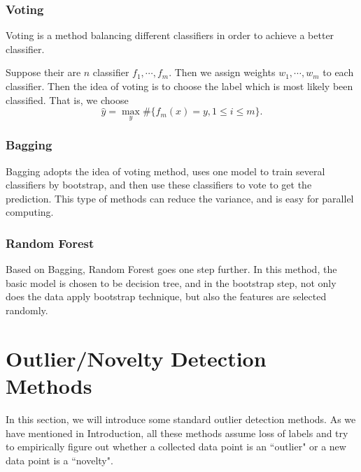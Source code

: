 \documentclass[english]{article}
\begin{document}
\subsubsection{Voting}
\par Voting is a method balancing different classifiers in order to achieve a better classifier.
\par Suppose their are $n$ classifier $f_{1}, \cdots, f_{m}$. Then we assign weights $w_{1}, \cdots, w_{m}$ to each classifier. Then the idea of voting is to choose the label which is most likely been classified. That is, we choose 
\begin{equation}
	\hat{y} = \max_{y}\#\{f_{m}(x) = y, 1\le i\le m\}.
\end{equation}

\subsubsection{Bagging}
\par Bagging adopts the idea of voting method, uses one model to train several classifiers by bootstrap, and then use these classifiers to vote to get the prediction. This type of methods can reduce the variance, and is easy for parallel computing.

\subsubsection{Random Forest}
\par Based on Bagging, Random Forest goes one step further. In this method, the basic model is chosen to be decision tree, and in the bootstrap step, not only does the data apply bootstrap technique, but also the features are selected randomly.

\section{Outlier/Novelty Detection Methods}

\par
In this section, we will introduce some standard outlier detection methods. As we have mentioned in Introduction, all these methods assume loss of labels and try to empirically figure out whether a collected data point is an ``outlier" or a new data point is a ``novelty". 
\end{document}
